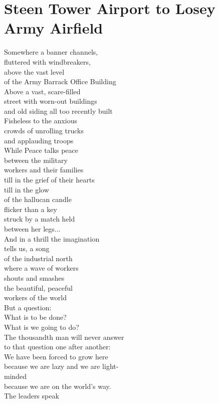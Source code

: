 \documentclass[smalldemyvopaper,11pt,twoside,onecolumn,openright,extrafontsizes]{memoir}
\begin{document}
\chapter{Steen Tower Airport to Losey Army Airfield}
Somewhere a banner channels,
\\fluttered with windbreakers,
\\above the vast level
\\of the Army Barrack Office Building
\\Above a vast, scare-filled
\\street with worn-out buildings
\\and old siding all too recently built
\\Fisheless to the anxious
\\crowds of unrolling trucks
\\and applauding troops
\\While Peace talks peace
\\between the military
\\workers and their families
\\till in the grief of their hearts
\\till in the glow
\\of the hallucan candle
\\flicker than a key
\\struck by a match held
\\between her legs...
\\And in a thrill the imagination
\\tells us, a song
\\of the industrial north
\\where a wave of workers
\\shouts and smashes
\\the beautiful, peaceful
\\workers of the world
\\But a question:
\\What is to be done?
\\What is we going to do?
\\The thousandth man will never answer
\\to that question one after another:
\\We have been forced to grow here
\\because we are lazy and we are light-
\\minded
\\because we are on the world's way.
\\The leaders speak
\end{document}
